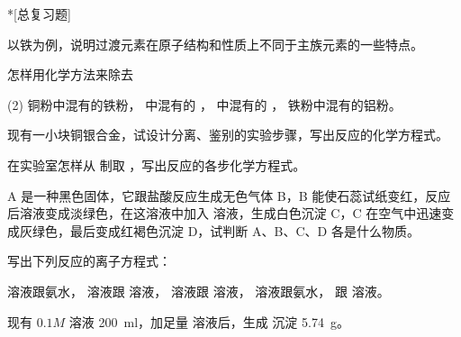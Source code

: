 \begin{Exercise}*[总复习题]
\begin{question}
  \item 以铁为例，说明过渡元素在原子结构和性质上不同于主族元素的一些特点。
  \item 怎样用化学方法来除去
  \begin{tasks}(2)
    \task 铜粉中混有的铁粉，
    \task {} 中混有的 ，
    \task {} 中混有的 ，
    \task 铁粉中混有的铝粉。
  \end{tasks}
  \item 现有一小块铜银合金，试设计分离、鉴别的实验步骤，写出反应的化学方程式。
  \item 在实验室怎样从  制取 ，写出反应的各步化学方程式。
  \item A 是一种黑色固体，它跟盐酸反应生成无色气体 B，B 能使石蕊试纸变红，反应后溶液变成淡绿色，在这溶液中加入  溶液，生成白色沉淀 C，C 在空气中迅速变成灰绿色，最后变成红褐色沉淀 D，试判断 A、B、C、D 各是什么物质。
  \item 写出下列反应的离子方程式：
  \begin{tasks}
    \task {} 溶液跟氨水，
    \task {} 溶液跟  溶液，
    \task {} 溶液跟  溶液，
    \task {} 溶液跟氨水，
    \task {} 跟  溶液。
  \end{tasks}
  \item 现有 $0.1M$  溶液 \qty{200}{ml}，加足量  溶液后，生成  沉淀 \qty{5.74}{g}。
  

\end{question}
\end{Exercise}
